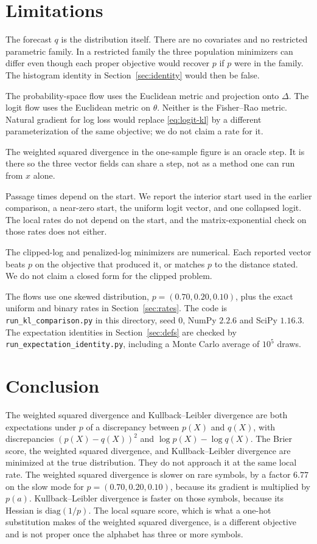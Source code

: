 \documentclass[10pt]{article}
\begin{document}
\section{Limitations}

The forecast $q$ is the distribution itself.
There are no covariates and no restricted parametric family.
In a restricted family the three population minimizers can differ even though each proper objective would recover $p$ if $p$ were in the family.
The histogram identity in Section~\ref{sec:identity} would then be false.

The probability-space flow uses the Euclidean metric and projection onto $\Delta$.
The logit flow uses the Euclidean metric on $\theta$.
Neither is the Fisher--Rao metric.
Natural gradient for log loss would replace \eqref{eq:logit-kl} by a different parameterization of the same objective; we do not claim a rate for it.

The weighted squared divergence in the one-sample figure is an oracle step.
It is there so the three vector fields can share a step, not as a method one can run from $x$ alone.

Passage times depend on the start.
We report the interior start used in the earlier comparison, a near-zero start, the uniform logit vector, and one collapsed logit.
The local rates do not depend on the start, and the matrix-exponential check on those rates does not either.

The clipped-log and penalized-log minimizers are numerical.
Each reported vector beats $p$ on the objective that produced it, or matches $p$ to the distance stated.
We do not claim a closed form for the clipped problem.

The flows use one skewed distribution, $p=(0.70,0.20,0.10)$, plus the exact uniform and binary rates in Section~\ref{sec:rates}.
The code is \texttt{run\_kl\_comparison.py} in this directory, seed $0$, NumPy $2.2.6$ and SciPy $1.16.3$.
The expectation identities in Section~\ref{sec:defs} are checked by \texttt{run\_expectation\_identity.py}, including a Monte Carlo average of $10^5$ draws.

\section{Conclusion}

The weighted squared divergence and Kullback--Leibler divergence are both expectations under $p$ of a discrepancy between $p(X)$ and $q(X)$, with discrepancies $(p(X)-q(X))^2$ and $\log p(X)-\log q(X)$.
The Brier score, the weighted squared divergence, and Kullback--Leibler divergence are minimized at the true distribution.
They do not approach it at the same local rate.
The weighted squared divergence is slower on rare symbols, by a factor $6.77$ on the slow mode for $p=(0.70,0.20,0.10)$, because its gradient is multiplied by $p(a)$.
Kullback--Leibler divergence is faster on those symbols, because its Hessian is $\mathrm{diag}(1/p)$.
The local square score, which is what a one-hot substitution makes of the weighted squared divergence, is a different objective and is not proper once the alphabet has three or more symbols.
\end{document}
